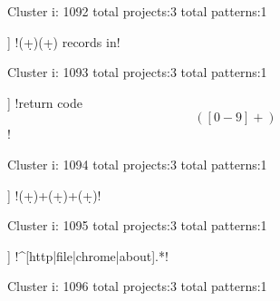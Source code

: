 Cluster i: 1092
total projects:3
total patterns:1
\begin{multicols}{1}
\begin{description}[noitemsep,topsep=0pt]
\item [[3] ] \cverb!(\d+)\+(\d+) records in!
\end{description}
\end{multicols}







Cluster i: 1093
total projects:3
total patterns:1
\begin{multicols}{1}
\begin{description}[noitemsep,topsep=0pt]
\item [[3] ] \cverb!return code \[([0-9]+)\]!
\end{description}
\end{multicols}







Cluster i: 1094
total projects:3
total patterns:1
\begin{multicols}{1}
\begin{description}[noitemsep,topsep=0pt]
\item [[3] ] \cverb!(\d+)\s+(\d+)\s+(\d+)!
\end{description}
\end{multicols}







Cluster i: 1095
total projects:3
total patterns:1
\begin{multicols}{1}
\begin{description}[noitemsep,topsep=0pt]
\item [[3] ] \cverb!^[http|file|chrome|about].*!
\end{description}
\end{multicols}







Cluster i: 1096
total projects:3
total patterns:1
\begin{multicols}{1}
\end{multicols}







